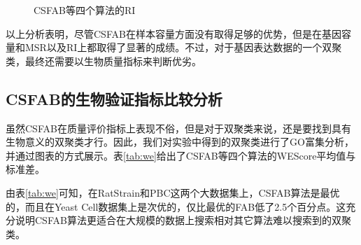    \begin{figure}[htbp]
    \setlength{\subfigcapskip}{-1bp}
    \centering
    \begin{minipage}{.8\textwidth}
    \centering
    \subfigure{\label{fig:ri_bcll}}\addtocounter{subfigure}{-2}
    \hspace{.2em}
    \subfigure{\label{fig:ri_yc}}\addtocounter{subfigure}{-2}
    \end{minipage}
    \centering
    \begin{minipage}{.8\textwidth}
    \centering
    \hspace{.2em}
    \subfigure{\label{fig:ri_pbc}}\addtocounter{subfigure}{-2}
    \hspace{.2em}
    \subfigure{\label{fig:ri_rat}}\addtocounter{subfigure}{-2}
    \end{minipage}
    \vspace{0.2em}
    \caption{CSFAB等四个算法的RI}
    \label{fig:ri}
    \end{figure}

    以上分析表明，尽管CSFAB在样本容量方面没有取得足够的优势，但是在基因容量和MSR以及RI上都取得了显著的成绩。不过，对于基因表达数据的一个双聚类，最终还需要以生物质量指标来判断优劣。

    \subsection{CSFAB的生物验证指标比较分析}
    虽然CSFAB在质量评价指标上表现不俗，但是对于双聚类来说，还是要找到具有生物意义的双聚类才行。因此，我们对实验中得到的双聚类进行了GO富集分析，并通过图表的方式展示。表\ref{tab:we}给出了CSFAB等四个算法的WEScore平均值与标准差。

    由表\ref{tab:we}可知，在RatStrain和PBC这两个大数据集上，CSFAB算法是最优的，而且在Yeast Cell数据集上是次优的，仅比最优的FAB低了2.5个百分点。这充分说明CSFAB算法更适合在大规模的数据上搜索相对其它算法难以搜索到的双聚类。

